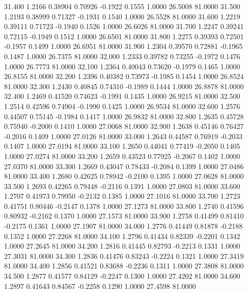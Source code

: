   31.400   1.2166   0.38904   0.70926  -0.1922   0.1555   1.0000  26.5008  81.0000
  31.500   1.2193   0.38999   0.71327  -0.1931   0.1540   1.0000  26.5528  81.0000
  31.600   1.2219   0.39111   0.71723  -0.1940   0.1526   1.0000  26.6026  81.0000
  31.700   1.2247   0.39241   0.72115  -0.1949   0.1512   1.0000  26.6501  81.0000
  31.800   1.2275   0.39393   0.72501  -0.1957   0.1499   1.0000  26.6951  81.0000
  31.900   1.2304   0.39570   0.72881  -0.1965   0.1487   1.0000  26.7375  81.0000
  32.000   1.2333   0.39782   0.73255  -0.1972   0.1476   1.0000  26.7773  81.0000
  32.100   1.2364   0.40043   0.73620  -0.1979   0.1465   1.0000  26.8155  81.0000
  32.200   1.2396   0.40382   0.73973  -0.1985   0.1454   1.0000  26.8524  81.0000
  32.300   1.2430   0.40845   0.74310  -0.1989   0.1444   1.0000  26.8878  81.0000
  32.400   1.2469   0.41520   0.74623  -0.1991   0.1435   1.0000  26.9215  81.0000
  32.500   1.2514   0.42596   0.74904  -0.1990   0.1425   1.0000  26.9534  81.0000
  32.600   1.2576   0.44507   0.75145  -0.1984   0.1417   1.0000  26.9832  81.0000
  32.800   1.2635   0.45728   0.75940  -0.2000   0.1410   1.0000  27.0068  81.0000
  32.900   1.2638   0.45146   0.76427  -0.2016   0.1409   1.0000  27.0126  81.0000
  33.000   1.2643   0.44587   0.76919  -0.2033   0.1407   1.0000  27.0194  81.0000
  33.100   1.2650   0.44041   0.77419  -0.2050   0.1405   1.0000  27.0274  81.0000
  33.200   1.2659   0.43523   0.77925  -0.2067   0.1402   1.0000  27.0370  81.0000
  33.300   1.2669   0.43047   0.78433  -0.2084   0.1399   1.0000  27.0486  81.0000
  33.400   1.2680   0.42625   0.78942  -0.2100   0.1395   1.0000  27.0628  81.0000
  33.500   1.2693   0.42265   0.79448  -0.2116   0.1391   1.0000  27.0803  81.0000
  33.600   1.2707   0.41973   0.79950  -0.2132   0.1385   1.0000  27.1016  81.0000
  33.700   1.2723   0.41751   0.80446  -0.2147   0.1378   1.0000  27.1273  81.0000
  33.800   1.2740   0.41596   0.80932  -0.2162   0.1370   1.0000  27.1573  81.0000
  33.900   1.2758   0.41499   0.81410  -0.2175   0.1361   1.0000  27.1907  81.0000
  34.000   1.2776   0.41449   0.81878  -0.2188   0.1352   1.0000  27.2268  81.0000
  34.100   1.2796   0.41434   0.82339  -0.2201   0.1342   1.0000  27.2645  81.0000
  34.200   1.2816   0.41445   0.82793  -0.2213   0.1331   1.0000  27.3031  81.0000
  34.300   1.2836   0.41476   0.83243  -0.2224   0.1321   1.0000  27.3419  81.0000
  34.400   1.2856   0.41521   0.83688  -0.2236   0.1311   1.0000  27.3808  81.0000
  34.500   1.2877   0.41577   0.84129  -0.2247   0.1300   1.0000  27.4202  81.0000
  34.600   1.2897   0.41643   0.84567  -0.2258   0.1290   1.0000  27.4598  81.0000

